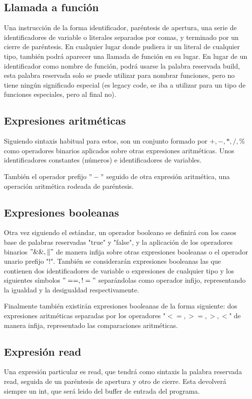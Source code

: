 \documentclass{article}
\begin{document}
\subsection{Llamada a función}
Una instrucción de la forma identificador, paréntesis de apertura, una serie de identificadores de variable o literales separados por comas, y terminado por un cierre de paréntesis.
En cualquier lugar donde pudiera ir un literal de cualquier tipo, también podrá aparecer una llamada de función en su lugar. En lugar de un identificador como nombre de función, podrá usarse la palabra reservada build, esta palabra reservada solo se puede utilizar para nombrar funciones, pero no tiene ningún significado especial (es legacy code, se iba a utilizar para un tipo de funciones especiales, pero al final no).

\subsection{Expresiones aritméticas}

Siguiendo sintaxis habitual para estos, son un conjunto formado por $+,-,*,/, \%$ como operadores binarios aplicados sobre otras expresiones aritméticas. Unos identificadores constantes (números) e identificadores de variables.

También el operador prefijo $"-"$ seguido de otra expresión aritmética, una operación aritmética rodeada de paréntesis.

\subsection{Expresiones booleanas}
Otra vez siguiendo el estándar, un operador booleano se definirá con los casos base de palabras reservadas "true" y "false", y la aplicación de los operadores binarios $"\&\&, \|"$ de manera infija sobre otras expresiones booleanas o el operador unario prefijo "!".
También se considerarán expresiones booleanas las que contienen dos identificadores de variable o expresiones de cualquier tipo y los siguientes símbolos $"==, !="$ separándolas como operador infijo, representando la igualdad y la desigualdad respectivamente.

Finalmente también existirán expresiones booleanas de la forma siguiente: dos expresiones aritméticas separadas por los operadores "$<=, >=, >, <$" de manera infija, representado las comparaciones aritméticas.

\subsection{Expresión read}
Una expresión particular es read, que tendrá como sintaxis la palabra reservada read, seguida de un paréntesis de apertura y otro de cierre. Esta devolverá siempre un int, que será leido del buffer de entrada del programa.
\end{document}
